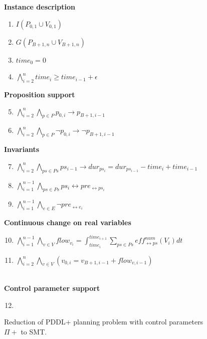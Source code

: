 \begin{figure}[thb!]
\begin{minipage}[t]{0.39\linewidth}
\textbf{Instance description}
\begin{enumerate}[label=P\arabic*.]
  \item $I(P_{0,1}\cup V_{0,1})$
  \item $G(P_{B+1,n}\cup V_{B+1,n})$
  \item $time_0 = 0$
  \item $\bigwedge_{i=2}^n time_i \geq time_{i-1}+\epsilon$
\end{enumerate}
\textbf{Proposition support}
\begin{enumerate}[label=P\arabic*.]\setcounter{enumi}{4}
  \item $\bigwedge_{i=2}^n \bigwedge_{p\in P} p_{0,i} \rightarrow p_{B+1,i-1}$
  \item $\bigwedge_{i=2}^n \bigwedge_{p\in P} \neg p_{0,i} \rightarrow \neg p_{B+1,i-1}$
\end{enumerate}
\end{minipage}
\begin{minipage}[t]{0.6\linewidth}
\textbf{Invariants}
\begin{enumerate}[label=P\arabic*.]\setcounter{enumi}{6}
  \item $\bigwedge_{i=2}^n \bigwedge_{ps\in Ps} ps_{i-1} \rightarrow dur_{ps_i} = dur_{ps_{i-1}} - time_i + time_{i-1}$
  \item $\bigwedge_{i=1}^{n-1} \bigwedge_{ps \in Ps}  ps_i \leftrightarrow pre_{\leftrightarrow ps_i}$
  \item $\bigwedge_{i=1}^{n-1} \bigwedge_{e\in E} \neg pre_{\leftrightarrow e_i}$
\end{enumerate}
\textbf{Continuous change on real variables}
\begin{enumerate}[label=P\arabic*.]\setcounter{enumi}{9}
  \item $\bigwedge_{i=1}^{n-1} \bigwedge_{v\in V} flow_{v_i} = \int^{time_{i+1}}_{time_i} \sum_{ps\in Ps} eff^{num}_{\leftrightarrow ps}(V_i)dt$
  \item $\bigwedge_{i=2}^n \bigwedge_{v\in V} (v_{0,i} = v_{B+1,i-1} + flow_{v,i-1})$
\end{enumerate}
\end{minipage}
\vspace{1em}\\\textbf{Control parameter support}
\begin{enumerate}[label=P\arabic*.]\setcounter{enumi}{11}
 \item {}
\end{enumerate}
\caption{Reduction of PDDL+ planning problem with control parameters $\Pi+$ to SMT.}
\label{eq:plan2}
\end{figure}

